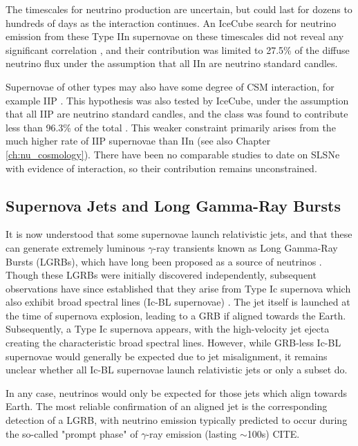 The timescales for neutrino production are uncertain, but could last for dozens to hundreds of days as the interaction continues. An IceCube search for neutrino emission from these Type IIn supernovae on these timescales did not reveal any significant correlation , and their contribution was limited to 27.5\%  of the diffuse neutrino flux under the assumption that all IIn are neutrino standard candles. 

Supernovae of other types may also have some degree of CSM interaction, for example IIP . This hypothesis was also tested by IceCube, under the assumption that all IIP are neutrino standard candles, and the class was found to contribute less than 96.3\% of the total \cite{Stasik2018Search}. This weaker constraint primarily arises from the much higher rate of IIP supernovae than IIn (see also Chapter \ref{ch:nu_cosmology}). There have been no comparable studies to date on SLSNe with evidence of interaction, so their contribution remains unconstrained.

\subsection*{Supernova Jets and Long Gamma-Ray Bursts}

It is now understood that some supernovae launch relativistic jets, and that these can generate extremely luminous $\gamma$-ray transients known as Long Gamma-Ray Bursts (LGRBs), which have long been proposed as a source of neutrinos . Though these LGRBs were initially discovered independently, subsequent observations have since established that they arise from Type Ic supernova which also exhibit broad spectral lines (Ic-BL supernovae) . The jet itself is launched at the time of supernova explosion, leading to a GRB if aligned towards the Earth. Subsequently, a Type Ic supernova appears, with the high-velocity jet ejecta creating the characteristic broad spectral lines. However, while GRB-less Ic-BL supernovae would generally be expected due to jet misalignment, it remains unclear whether all Ic-BL supernovae launch relativistic jets or only a subset do.

In any case, neutrinos would only be expected for those jets which align towards Earth. The most reliable confirmation of an aligned jet is the corresponding detection of a LGRB, with neutrino emission typically predicted to occur during the so-called "prompt phase" of $\gamma$-ray emission (lasting $\sim$100s) CITE. 

